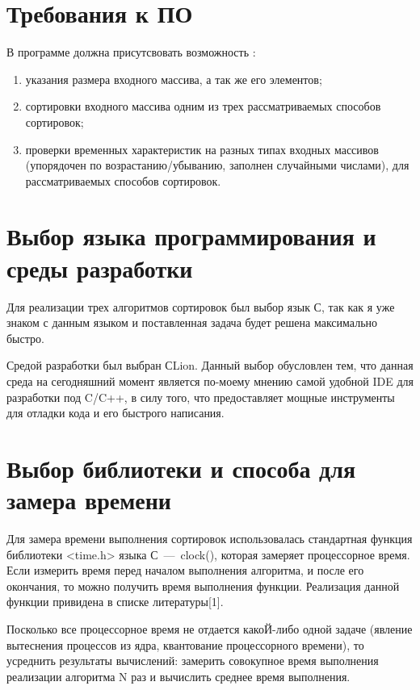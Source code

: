 \documentclass[12pt]{report}
\begin{document}
	\section{Требования к ПО}
	
	В программе должна присутсвовать возможность :
	
	\begin{enumerate}
		\item указания размера входного массива, а так же его элементов;
		\item сортировки входного массива одним из трех рассматриваемых способов сортировок;
		\item проверки временных характеристик на разных типах входных массивов (упорядочен по возрастанию/убыванию, заполнен случайными числами), для рассматриваемых способов сортировок.
	\end{enumerate}
	
	\section{Выбор языка программирования и среды разработки}
	
	Для реализации трех алгоритмов сортировок был выбор язык С, так как я уже знаком с данным языком и поставленная задача будет решена максимально быстро.

	Средой разработки был выбран СLion. Данный выбор обусловлен тем, что данная среда на сегодняшний момент является по-моему мнению самой удобной IDE для разработки под C/C++, в силу того, что предоставляет мощные инструменты для отладки кода и его быстрого написания. 
	
	\section{Выбор библиотеки и способа для замера времени}
		Для замера времени выполнения сортировок использовалась стандартная функция библиотеки <time.h> языка С~---~clock(), которая замеряет процессорное время. Если измерить время перед началом выполнения алгоритма, и после его окончания, то можно получить время выполнения функции. Реализация данной функции привидена в списке литературы[1].
		
		Посколько все процессорное время не отдается какоЙ-либо одной задаче (явление вытеснения процессов из ядра, квантование процессорного времени), то усреднить результаты вычислений: замерить совокупное время выполнения реализации алгоритма N раз и вычислить среднее время выполнения.
		
\end{document}
